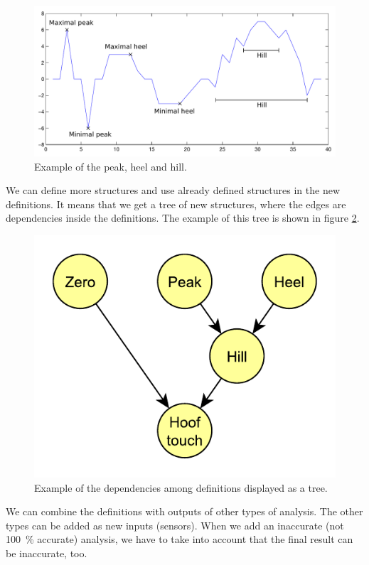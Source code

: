 \begin{figure}
    \centering
    \caption{Example of the peak, heel and hill.}
    \label{fig:peakHeelHill}
    \includegraphics[width=\linewidth]{img/peakHeelHillExample.pdf}
\end{figure}

We can define more structures and use already defined structures in the new definitions. It means that we get a tree of new structures, where the edges are dependencies inside the definitions. The example of this tree is shown in figure \ref{fig:definitionTree}.

\begin{figure}
    \centering
    \caption{Example of the dependencies among definitions displayed as a tree.}
    \label{fig:definitionTree}
    \includegraphics[scale=1]{img/definitionTree.pdf}
\end{figure}

We can combine the definitions with outputs of other types of analysis. The other types can be added as new inputs (sensors). When we add an inaccurate (not \SI{100}{\%} accurate) analysis, we have to take into account that the final result can be inaccurate, too.

